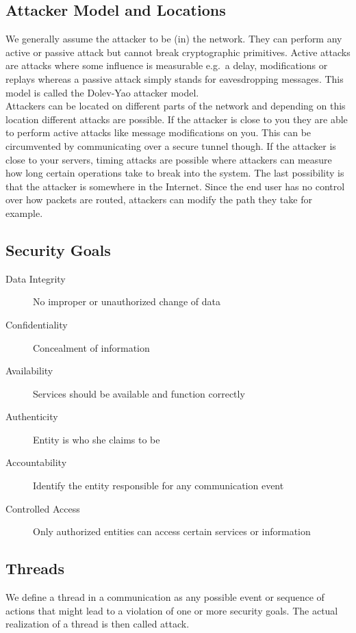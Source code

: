 \subsection{Attacker Model and Locations}
We generally assume the attacker to be (in) the network.
They can perform any active or passive attack but cannot break cryptographic primitives.
Active attacks are attacks where some influence is measurable e.g.\ a delay, modifications or replays whereas a passive attack simply stands for eavesdropping messages.
This model is called the Dolev-Yao attacker model.\\

Attackers can be located on different parts of the network and depending on this location different attacks are possible.
If the attacker is close to you they are able to perform active attacks like message modifications on you.
This can be circumvented by communicating over a secure tunnel though.
If the attacker is close to your servers, timing attacks are possible where attackers can measure how long certain operations take to break into the system.
The last possibility is that the attacker is somewhere in the Internet.
Since the end user has no control over how packets are routed, attackers can modify the path they take for example.

\subsection{Security Goals}
\begin{description}
  \item[Data Integrity] No improper or unauthorized change of data
  \item[Confidentiality] Concealment of information
  \item[Availability] Services should be available and function correctly
  \item[Authenticity] Entity is who she claims to be
  \item[Accountability] Identify the entity responsible for any communication event
  \item[Controlled Access] Only authorized entities can access certain services or information
\end{description}

\subsection{Threads}
We define a thread in a communication as any possible event or sequence of actions that might lead to a violation of one or more security goals.
The actual realization of a thread is then called attack.\\

